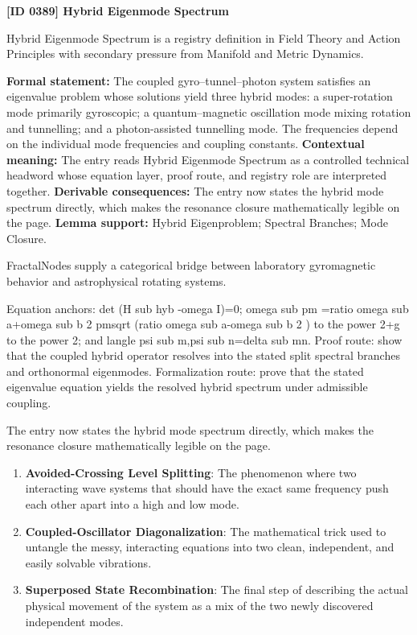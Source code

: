 \clearpage
\noindent\textbf{[ID 0389] Hybrid Eigenmode Spectrum}\par
\vspace{0.35em}
\begingroup\small
{}
Hybrid Eigenmode Spectrum is a registry definition in Field Theory and Action Principles with secondary pressure from Manifold and Metric Dynamics.

\begingroup\footnotesize\setlength{\emergencystretch}{3em}\sloppy
\textbf{Formal statement:} The coupled gyro--tunnel--photon system satisfies an eigenvalue problem whose solutions yield three hybrid modes: a super-rotation mode primarily gyroscopic; a quantum--magnetic oscillation mode mixing rotation and tunnelling; and a photon-assisted tunnelling mode. The frequencies depend on the individual mode frequencies and coupling constants. \textbf{Contextual meaning:} The entry reads Hybrid Eigenmode Spectrum as a controlled technical headword whose equation layer, proof route, and registry role are interpreted together. \textbf{Derivable consequences:} The entry now states the hybrid mode spectrum directly, which makes the resonance closure mathematically legible on the page. \textbf{Lemma support:} Hybrid Eigenproblem; Spectral Branches; Mode Closure.\par
\endgroup

FractalNodes supply a categorical bridge between laboratory gyromagnetic behavior and astrophysical rotating systems.

Equation anchors: det (H sub hyb -omega I)=0; omega sub pm =ratio omega sub a+omega sub b 2 pmsqrt (ratio omega sub a-omega sub b 2 ) to the power 2+g to the power 2; and langle psi sub m,psi sub n=delta sub mn. Proof route: show that the coupled hybrid operator resolves into the stated split spectral branches and orthonormal eigenmodes. Formalization route: prove that the stated eigenvalue equation yields the resolved hybrid spectrum under admissible coupling.

The entry now states the hybrid mode spectrum directly, which makes the resonance closure mathematically legible on the page.
\endgroup

\begin{enumerate}[leftmargin=1.6em,itemsep=6pt,topsep=4pt]
\item \textbf{Avoided-Crossing Level Splitting}: The phenomenon where two interacting wave systems that should have the exact same frequency push each other apart into a high and low mode.
\item \textbf{Coupled-Oscillator Diagonalization}: The mathematical trick used to untangle the messy, interacting equations into two clean, independent, and easily solvable vibrations.
\item \textbf{Superposed State Recombination}: The final step of describing the actual physical movement of the system as a mix of the two newly discovered independent modes.
\end{enumerate}


